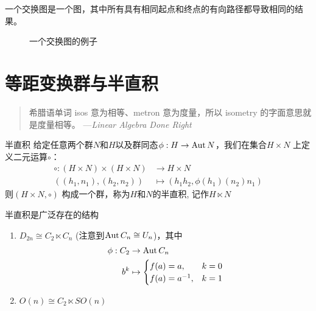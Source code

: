 \begin{definition}
    一个交换图是一个图，其中所有具有相同起点和终点的有向路径都导致相同的结果。
    \begin{figure}[H]
        \centering
        \caption{一个交换图的例子}
    \end{figure}
\end{definition}

\section{等距变换群与半直积}

\begin{quote}
    希腊语单词 isos 意为相等、metron 意为度量，所以 isometry 的字面意思就是度量相等。
    \hfill ---\textit{Linear Algebra Done Right}
\end{quote}

\begin{definition}{半直积}
    给定任意两个群\(N\)和\(H\)以及群同态\(\phi: H \to \operatorname{\mathrm{Aut}}{N}\)，我们在集合\(H
    \times N\) 上定义二元运算\(\circ\)：
    \begin{align*}
        \circ : (H\times N)\times (H\times N) & \to H\times N \\
        ((h_{1}, n_{1}), (h_{2}, n_{2})) & \mapsto
        (h_{1}h_{2}, \phi(h_{1})(n_{2})n_{1})
    \end{align*}
    则\((H\times N, \circ )\) 构成一个群，称为\(H\)和\(N\)的半直积,
    记作\(H\ltimes N\)
\end{definition}

半直积是广泛存在的结构
\begin{enumerate}
    \item \(D_{2n}\cong C_{2}\ltimes C_{n}\) (注意到\(\operatorname{\mathrm{Aut}}
        C_{n}\cong U_{n}\))，其中
        \begin{align*}
            \phi: C_{2} & \to \operatorname{\mathrm{Aut}}{C_{n}} \\
            b^{k} & \mapsto
            \begin{cases}
                f(a)  = a, & k=0 \\
                f(a)  = a^{-1}, &k=1
            \end{cases}
        \end{align*}
    \item \(O(n)\cong C_{2} \ltimes SO(n)\)
\end{enumerate}


